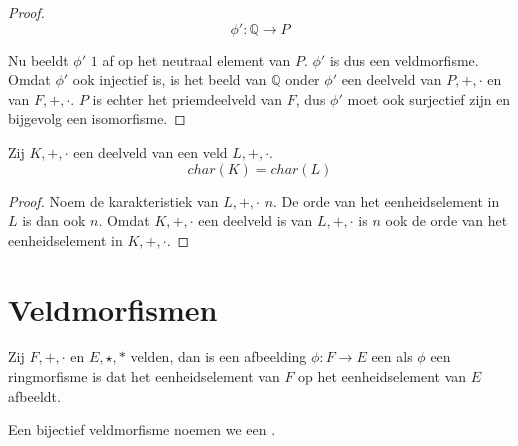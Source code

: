 \documentclass[main.tex]{subfiles}
\begin{document}
\begin{st}
\begin{proof}
    \[ \phi': \mathbb{Q} \rightarrow P \]
    \begin{figure}[H]
      \centering
    \end{figure}
    Nu beeldt $\phi'$ $1$ af op het neutraal element van $P$.
    $\phi'$ is dus een veldmorfisme.
    Omdat $\phi'$ ook injectief is, is het beeld van $\mathbb{Q}$ onder $\phi'$ een deelveld van $P,+,\cdot$ en van $F,+,\cdot$.
    $P$ is echter het priemdeelveld van $F$, dus $\phi'$ moet ook surjectief zijn en bijgevolg een isomorfisme.
  \end{proof}
\end{st}

\begin{st}
  Zij $K,+,\cdot$ een deelveld van een veld $L,+,\cdot$.
  \[ char(K) = char(L) \]

  \begin{proof}
    Noem de karakteristiek van $L,+,\cdot$ $n$.
    De orde van het eenheidselement in $L$ is dan ook $n$.
    Omdat $K,+,\cdot$ een deelveld is van $L,+,\cdot$ is $n$ ook de orde van het eenheidselement in $K,+,\cdot$.
  \end{proof}
\end{st}

\section{Veldmorfismen}
\label{sec:veldmorfismen}

\begin{de}
  Zij $F,+,\cdot$ en $E,\star,*$ velden, dan is een afbeelding $\phi: F \rightarrow E$ een  als $\phi$ een ringmorfisme is dat het eenheidselement van $F$ op het eenheidselement van $E$ afbeeldt.
\end{de}

\begin{de}
  Een bijectief veldmorfisme noemen we een .
\end{de}
\end{document}
